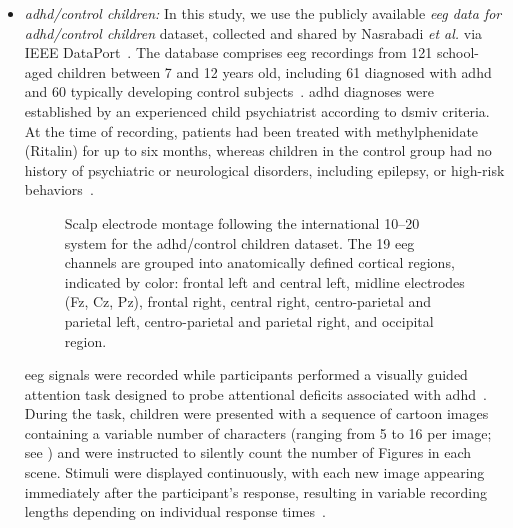 \begin{itemize}
    \begin{figure}[htbp]
     \centering
      
      \caption{Overview of the \gls{eegmmidb} \gls{mi}-\gls{eeg} dataset: experimental timeline.}
      \label{fig:physionet}
    \end{figure}

    \item[--] \textit{\gls{adhd}/control children:}
    In this study, we use the publicly available \textit{\gls{eeg} data for \gls{adhd}/control children} dataset, collected and shared by Nasrabadi \textit{et al.} via IEEE DataPort~\cite{nasrabadi2020eeg}. The database comprises \gls{eeg} recordings from 121 school-aged children between 7 and 12 years old, including 61 diagnosed with \gls{adhd} and 60 typically developing control subjects~\cite{ekhlasi2021pte,li2025gcn}. \gls{adhd} diagnoses were established by an experienced child psychiatrist according to \gls{dsmiv} criteria. At the time of recording, patients had been treated with methylphenidate (Ritalin) for up to six months, whereas children in the control group had no history of psychiatric or neurological disorders, including epilepsy, or high-risk behaviors~\cite{ekhlasi2021pte,li2025gcn}.

    \begin{figure}[H]
      \centering
      \resizebox{0.5\textwidth}{!}{}
     \caption{Scalp electrode montage following the international 10--20 system for the \gls{adhd}/control children dataset. The 19 \gls{eeg} channels are grouped into anatomically defined cortical regions, indicated by color:  frontal left and central left,  midline electrodes (Fz, Cz, Pz),  frontal right,  central right,  centro-parietal and parietal left,  centro-parietal and parietal right, and  occipital region.}
    \label{fig:TDHA}
    \end{figure}
    
    \gls{eeg} signals were recorded while participants performed a visually guided attention task designed to probe attentional deficits associated with \gls{adhd}~\cite{ekhlasi2021pte,diagnosticInterface2024}. During the task, children were presented with a sequence of cartoon images containing a variable number of characters (ranging from 5 to 16 per image; see ) and were instructed to silently count the number of Figures in each scene. Stimuli were displayed continuously, with each new image appearing immediately after the participant’s response, resulting in variable recording lengths depending on individual response times~\cite{li2025gcn,diagnosticInterface2024}.


\end{itemize}
